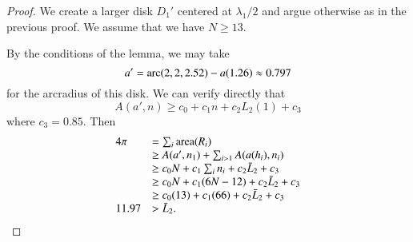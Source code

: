 \begin{proof}  We create
a larger disk $D_1'$ centered at $\lambda_1/2$ and argue otherwise
as in the previous proof.  We assume that we have $N\ge 13$.


By the conditions of the lemma, we may take 
$$a'=\operatorname{arc}(2,2,2.52)-a(1.26) \approx 0.797$$
for the arcradius of this disk.  We can verify directly that
$$A(a',n) \ge c_0 + c_1 n + c_2 L_2(1) + c_3$$
where $c_3 = 0.85$.
Then 
$$
\begin{array}{lll}
4\pi &= \sum_i{\operatorname{area}}(R_i)\\
     &\ge A(a',n_1)+\sum_{i>1} A(a(h_i),n_i) \\
     &\ge  c_0 N +c_1\sum_i n_i + c_2 \bar L_2 + c_3\\
     &\ge c_0 N +c_1 (6N-12) + c_2 \bar L_2 + c_3\\
     &\ge  c_0 (13) +c_1 (66) + c_2 \bar L_2 + c_3\\
11.97 &> \bar L_2. 
\end{array}
$$
\end{proof}

